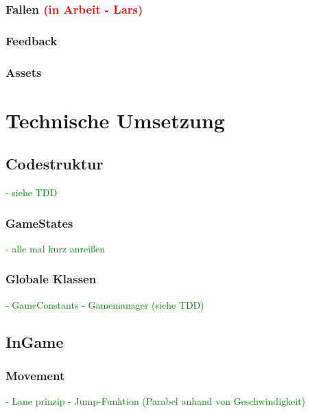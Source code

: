 \documentclass{article}
\begin{document}
\subsubsection{Fallen \textcolor{red}{(in Arbeit - Lars)}}

\vspace{1cm}
\subsubsection{Feedback}

\vspace{1cm}
\subsubsection{Assets}

\newpage
\section{Technische Umsetzung}

\vspace{2cm}
\subsection{Codestruktur}
\textcolor{green}{- siehe TDD}

\vspace{1cm}
\subsubsection{GameStates}
\textcolor{green}{- alle mal kurz anreißen}

\vspace{1cm}
\subsubsection{Globale Klassen}
\textcolor{green}{- GameConstants \newline
- Gamemanager (siehe TDD)}

\vspace{2cm}
\subsection{InGame}

\vspace{1cm}
\subsubsection{Movement}
\textcolor{green}{- Lane prinzip \newline
- Jump-Funktion (Parabel anhand von Geschwindigkeit)}
\end{document}
